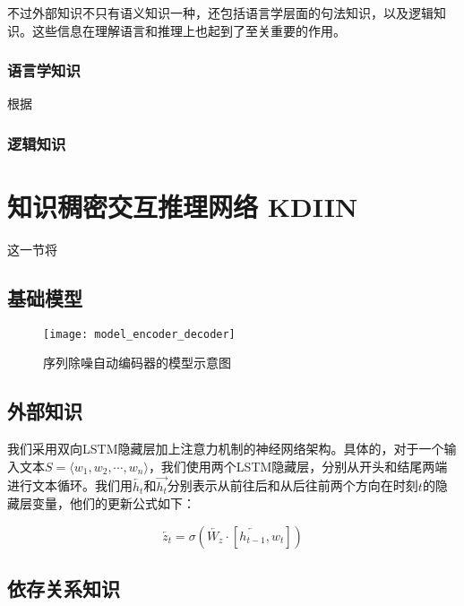 \documentclass[UTF8,11pt,a4paper,nofonts]{ctexart}
\begin{document}
不过外部知识不只有语义知识一种，还包括语言学层面的句法知识，以及逻辑知识。这些信息在理解语言和推理上也起到了至关重要的作用。

\subsubsection{语言学知识}

根据

\subsubsection{逻辑知识}





\section{知识稠密交互推理网络 KDIIN}

这一节将
\subsection{基础模型}

\begin{figure}
\centering
\texttt{[image: model\_encoder\_decoder]}
\caption{序列除噪自动编码器的模型示意图}\label{fig:01}
\end{figure} 

\subsection{外部知识}

我们采用双向LSTM隐藏层加上注意力机制的神经网络架构。具体的，对于一个输入文本$S=\langle w_1,w_2,\cdots,w_n \rangle$，我们使用两个LSTM隐藏层，分别从开头和结尾两端进行文本循环。我们用$\overleftarrow{h_t}$和$\overrightarrow{h_t}$分别表示从前往后和从后往前两个方向在时刻$t$的隐藏层变量，他们的更新公式如下：

\begin{equation}
\overleftarrow{z_t} = \sigma(\overleftarrow{W_z} \cdot [\overleftarrow{h_{t-1}},w_t])
\end{equation}


\subsection{依存关系知识}
\end{document}
